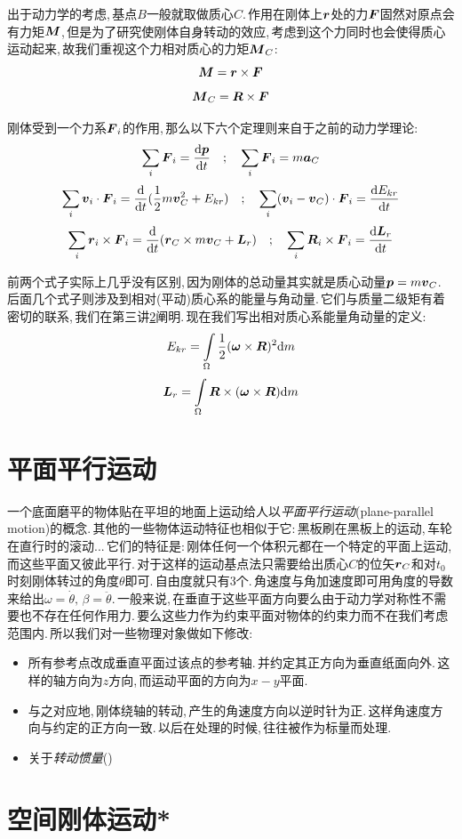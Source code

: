 出于动力学的考虑,\,基点$B$一般就取做质心$C$.\,作用在刚体上$\boldsymbol{r}$处的力$\boldsymbol{F}$固然对原点会有力矩$\boldsymbol{M}$,\,但是为了研究使刚体自身转动的效应,\,考虑到这个力同时也会使得质心运动起来,\,故我们重视这个力相对质心的力矩$\boldsymbol{M}_C$:
\[\boldsymbol{M}=\boldsymbol{r}\times\boldsymbol{F}\]
\[\boldsymbol{M}_C=\boldsymbol{R}\times\boldsymbol{F}\]

刚体受到一个力系${\boldsymbol{F}_i}$的作用,\,那么以下六个定理则来自于之前的动力学理论:
\[\sum_i\boldsymbol{F}_i=\frac{\textrm{d} \boldsymbol{p}}{\textrm{d} t}\quad ; \quad \sum_i\boldsymbol{F}_i=m\boldsymbol{a}_C\]
\[\sum_i \boldsymbol{v}_i\cdot \boldsymbol{F}_i=\frac{\textrm{d} }{\textrm{d} t}(\frac{1}{2}m\boldsymbol{v}_C^2+E_{kr})\quad ;\quad \sum_i(\boldsymbol{v}_i-\boldsymbol{v}_C)\cdot \boldsymbol{F}_i=\frac{\textrm{d} E_{kr}}{\textrm{d} t}\]
\[\sum_i \boldsymbol{r}_i\times \boldsymbol{F}_i=\frac{\textrm{d} }{\textrm{d} t}(\boldsymbol{r}_C\times m\boldsymbol{v}_C+\boldsymbol{L}_r)\quad ;\quad \sum_i \boldsymbol{R}_i\times \boldsymbol{F}_i=\frac{\textrm{d} \boldsymbol{L}_r}{\textrm{d} t}\]

前两个式子实际上几乎没有区别,\,因为刚体的总动量其实就是质心动量$\boldsymbol{p}=m\boldsymbol{v}_C$.\,后面几个式子则涉及到相对(平动)质心系的能量与角动量.\,它们与质量二级矩有着密切的联系,\,我们在第三讲\ref{6.3}阐明.\,现在我们写出相对质心系能量角动量的定义:
\[E_{kr}=\int\limits_\Omega \frac{1}{2}(\boldsymbol{\omega}\times \boldsymbol{R})^2\textrm{d} m\]
\[\boldsymbol{L}_r=\int\limits_\Omega \boldsymbol{R}\times(\boldsymbol{\omega}\times \boldsymbol{R})\textrm{d} m\]




\section{平面平行运动}
一个底面磨平的物体贴在平坦的地面上运动给人以\emph{平面平行运动}(plane-parallel motion)的概念.\,其他的一些物体运动特征也相似于它:\,黑板刷在黑板上的运动,\,车轮在直行时的滚动...\,它们的特征是:\,刚体任何一个体积元都在一个特定的平面上运动,\,而这些平面又彼此平行.\,对于这样的运动基点法只需要给出质心$C$的位矢$\boldsymbol{r}_C$和对$t_0$时刻刚体转过的角度$\theta$即可.\,自由度就只有3个.\,角速度与角加速度即可用角度的导数来给出$\omega=\dot{\theta},\,\beta=\ddot{\theta}$.\,一般来说,\,在垂直于这些平面方向要么由于动力学对称性不需要也不存在任何作用力.\,要么这些力作为约束平面对物体的约束力而不在我们考虑范围内.\,所以我们对一些物理对象做如下修改:\,
\begin{itemize}
\item 所有参考点改成垂直平面过该点的参考轴.\,并约定其正方向为垂直纸面向外.\,这样的轴方向为$z$方向,\,而运动平面的方向为$x-y$平面.
\item 与之对应地,\,刚体绕轴的转动,\,产生的角速度方向以逆时针为正.\,这样角速度方向与约定的正方向一致.\,以后在处理的时候,\,往往被作为标量而处理.
\item 关于\emph{转动惯量}()
\end{itemize}
\section{空间刚体运动*}\label{6.3}


